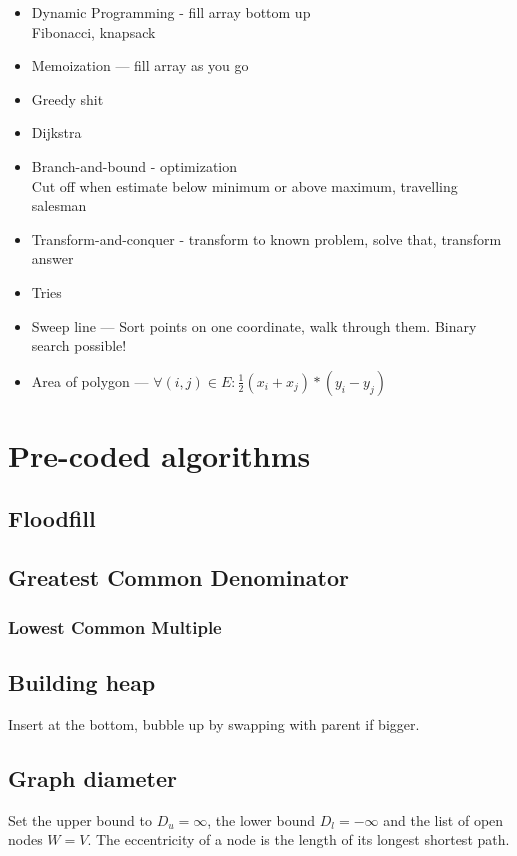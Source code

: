 \documentclass[10pt,hidelinks]{article}
\begin{document}
\begin{itemize}
\item Dynamic Programming - fill array bottom up \\
	Fibonacci, knapsack
\item Memoization --- fill array as you go
\item Greedy shit
\item Dijkstra
\item Branch-and-bound - optimization \\
	Cut off when estimate below minimum or above maximum, travelling salesman
\item Transform-and-conquer - transform to known problem, solve that, transform answer
\item Tries
\item Sweep line --- Sort points on one coordinate, walk through them. Binary search possible!
\item Area of polygon --- $\forall (i, j) \in E: \frac12 (x_i+x_j)*(y_i-y_j)$
\end{itemize}

\pagebreak

\section{Pre-coded algorithms}

\subsection{Floodfill}


\subsection{Greatest Common Denominator}


\subsubsection{Lowest Common Multiple}


\subsection{Building heap}
Insert at the bottom, bubble up by swapping with parent if bigger.

\subsection{Graph diameter}
Set the upper bound to $D_u = \infty$, the lower bound $D_l = -\infty$ and the
list of open nodes $W = V$. The eccentricity of a node is the length of its
longest shortest path.
\end{document}
